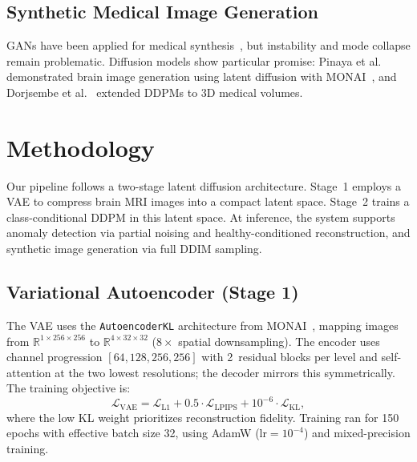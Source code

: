 \documentclass[graybox]{svmult}
\begin{document}
\subsection{Synthetic Medical Image Generation}

GANs have been applied for medical synthesis~\cite{yi2019generative}, but instability and mode collapse remain problematic. Diffusion models show particular promise: Pinaya et al.~\cite{pinaya2022brain} demonstrated brain image generation using latent diffusion with MONAI~\cite{pinaya2023generative}, and Dorjsembe et al.~\cite{dorjsembe2022three} extended DDPMs to 3D medical volumes.

\section{Methodology}
\label{sec:methodology}

Our pipeline follows a two-stage latent diffusion architecture. Stage~1 employs a VAE to compress brain MRI images into a compact latent space. Stage~2 trains a class-conditional DDPM in this latent space. At inference, the system supports anomaly detection via partial noising and healthy-conditioned reconstruction, and synthetic image generation via full DDIM sampling.

\subsection{Variational Autoencoder (Stage 1)}
\label{sec:vae}

The VAE uses the \texttt{AutoencoderKL} architecture from MONAI~\cite{monai2022, pinaya2023generative}, mapping images from $\mathbb{R}^{1 \times 256 \times 256}$ to $\mathbb{R}^{4 \times 32 \times 32}$ ($8\times$ spatial downsampling). The encoder uses channel progression $[64, 128, 256, 256]$ with 2~residual blocks per level and self-attention at the two lowest resolutions; the decoder mirrors this symmetrically. The training objective is:
\begin{equation}
\mathcal{L}_{\text{VAE}} = \mathcal{L}_{\text{L1}} + 0.5 \cdot \mathcal{L}_{\text{LPIPS}} + 10^{-6} \cdot \mathcal{L}_{\text{KL}},
\label{eq:vae_loss}
\end{equation}
where the low KL weight prioritizes reconstruction fidelity. Training ran for 150 epochs with effective batch size 32, using AdamW ($\text{lr} = 10^{-4}$) and mixed-precision training.
\end{document}
